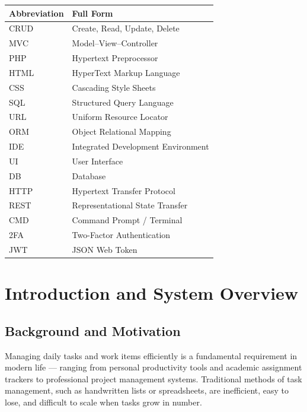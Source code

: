 \documentclass[12pt,a4paper]{report}
\begin{document}
\begin{titlepage}
\begin{tabularx}{\textwidth}{@{}lX@{}}
\toprule
\textbf{Abbreviation} & \textbf{Full Form} \\
\midrule
CRUD   & Create, Read, Update, Delete \\
MVC    & Model--View--Controller \\
PHP    & Hypertext Preprocessor \\
HTML   & HyperText Markup Language \\
CSS    & Cascading Style Sheets \\
SQL    & Structured Query Language \\
URL    & Uniform Resource Locator \\
ORM    & Object Relational Mapping \\
IDE    & Integrated Development Environment \\
UI     & User Interface \\
DB     & Database \\
HTTP   & Hypertext Transfer Protocol \\
REST   & Representational State Transfer \\
CMD    & Command Prompt / Terminal \\
2FA    & Two-Factor Authentication \\
JWT    & JSON Web Token \\
\bottomrule
\end{tabularx}

\tableofcontents
\listoftables
\listoffigures

\clearpage
{}

\chapter{Introduction and System Overview}

\section{Background and Motivation}

Managing daily tasks and work items efficiently is a fundamental requirement in
modern life --- ranging from personal productivity tools and academic assignment
trackers to professional project management systems. Traditional methods of task
management, such as handwritten lists or spreadsheets, are inefficient, easy to lose,
and difficult to scale when tasks grow in number.


\end{titlepage}
\end{document}
